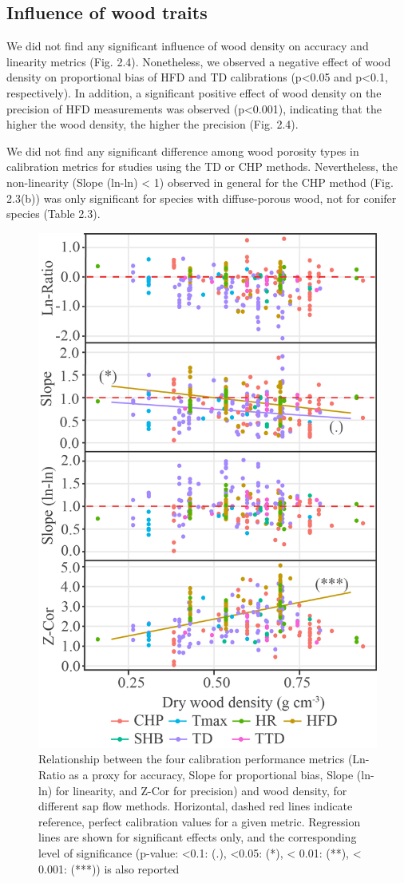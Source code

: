 \documentclass[11pt,twoside]{reedthesis}
\begin{document}
\subsection{Influence of wood traits}\label{influence-of-wood-traits}

We did not find any significant influence of wood density on accuracy
and linearity metrics (Fig. 2.4). Nonetheless, we observed a negative
effect of wood density on proportional bias of HFD and TD calibrations
(p\textless{}0.05 and p\textless{}0.1, respectively). In addition, a
significant positive effect of wood density on the precision of HFD
measurements was observed (p\textless{}0.001), indicating that the
higher the wood density, the higher the precision (Fig. 2.4).\par

We did not find any significant difference among wood porosity types in
calibration metrics for studies using the TD or CHP methods.
Nevertheless, the non-linearity (Slope (ln-ln) \textless{} 1) observed
in general for the CHP method (Fig. 2.3(b)) was only significant for
species with diffuse-porous wood, not for conifer species (Table
2.3).\par
\begin{figure}[hbt!]

{\centering \includegraphics[width=0.55\linewidth]{figure/CH2/DENSITY} 

}

\caption[Relationship between the four calibration performance and wood density, for different sap flow methods.]{Relationship between the four calibration performance metrics (Ln-Ratio as a proxy for accuracy, Slope for proportional bias, Slope (ln-ln) for linearity, and Z-Cor for precision) and wood density, for different sap flow methods. Horizontal, dashed red lines indicate reference, perfect calibration values for a given metric. Regression lines are shown for significant effects only, and the corresponding level of significance (p-value: <0.1: (.), <0.05: (*), < 0.01: (**), < 0.001: (***)) is also reported }\label{fig:ch2fig4}
\end{figure}
\end{document}
